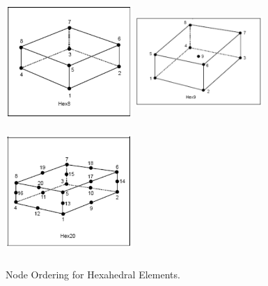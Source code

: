 \begin{figure}
\begin{center}
{\includegraphics[width=1.9in, height=1.9in]{topology/hex08.png}}
{\includegraphics[width=1.9in, height=1.9in]{topology/hex09.png}}
{\includegraphics[width=1.9in, height=1.9in]{topology/hex20.png}}
\caption{Node Ordering for Hexahedral Elements.}\label{topology:hex}
\end{center}
\end{figure}

